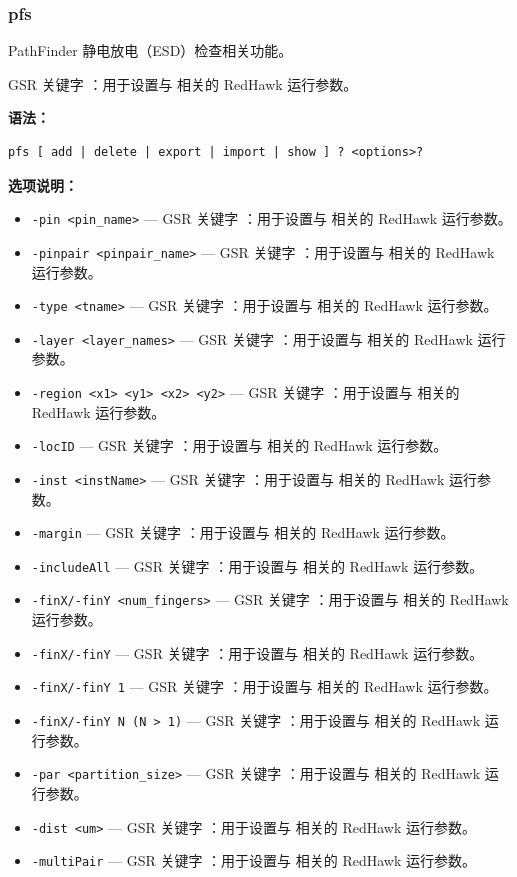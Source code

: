 \subsubsection*{pfs}

PathFinder 静电放电（ESD）检查相关功能。

GSR 关键字 ：用于设置与  相关的 RedHawk 运行参数。

\textbf{语法：}
\begin{lstlisting}
pfs [ add | delete | export | import | show ] ? <options>?
\end{lstlisting}

\textbf{选项说明：}
\begin{itemize}
\item \texttt{-pin <pin\_name>} — GSR 关键字 ：用于设置与  相关的 RedHawk 运行参数。
\item \texttt{-pinpair <pinpair\_name>} — GSR 关键字 ：用于设置与  相关的 RedHawk 运行参数。
\item \texttt{-type <tname>} — GSR 关键字 ：用于设置与  相关的 RedHawk 运行参数。
\item \texttt{-layer <layer\_names>} — GSR 关键字 ：用于设置与  相关的 RedHawk 运行参数。
\item \texttt{-region <x1> <y1> <x2> <y2>} — GSR 关键字 ：用于设置与  相关的 RedHawk 运行参数。
\item \texttt{-locID} — GSR 关键字 ：用于设置与  相关的 RedHawk 运行参数。
\item \texttt{-inst <instName>} — GSR 关键字 ：用于设置与  相关的 RedHawk 运行参数。
\item \texttt{-margin} — GSR 关键字 ：用于设置与  相关的 RedHawk 运行参数。
\item \texttt{-includeAll} — GSR 关键字 ：用于设置与  相关的 RedHawk 运行参数。
\item \texttt{-finX/-finY <num\_fingers>} — GSR 关键字 ：用于设置与  相关的 RedHawk 运行参数。
\item \texttt{-finX/-finY} — GSR 关键字 ：用于设置与  相关的 RedHawk 运行参数。
\item \texttt{-finX/-finY 1} — GSR 关键字 ：用于设置与  相关的 RedHawk 运行参数。
\item \texttt{-finX/-finY N (N > 1)} — GSR 关键字 ：用于设置与  相关的 RedHawk 运行参数。
\item \texttt{-par <partition\_size>} — GSR 关键字 ：用于设置与  相关的 RedHawk 运行参数。
\item \texttt{-dist <um>} — GSR 关键字 ：用于设置与  相关的 RedHawk 运行参数。
\item \texttt{-multiPair} — GSR 关键字 ：用于设置与  相关的 RedHawk 运行参数。

\end{itemize}
